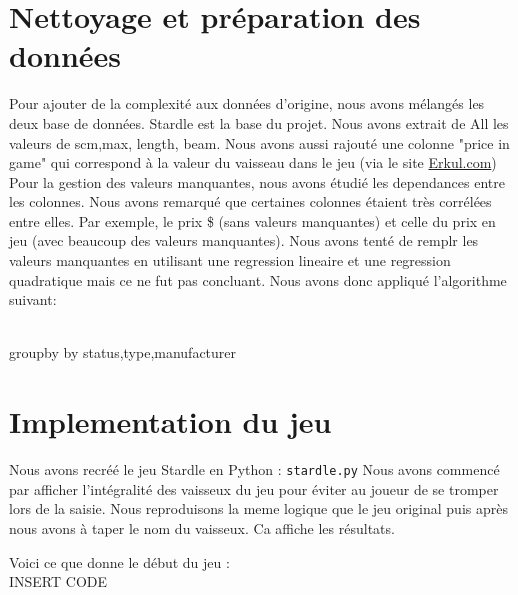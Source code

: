 \documentclass{article}
\begin{document}
\section{Nettoyage et préparation des données}

Pour ajouter de la complexité aux données d'origine, nous avons mélangés les deux base de données.
Stardle est la base du projet. Nous avons extrait de All les valeurs de scm,max, length, beam. Nous avons aussi 
rajouté une colonne "price in game" qui correspond à la valeur du vaisseau dans le jeu (via le site 
\href{https://www.erkul.games/live/calculator}{Erkul.com})\\

Pour la gestion des valeurs manquantes, nous avons étudié les dependances entre les colonnes.
Nous avons remarqué que certaines colonnes étaient très corrélées entre elles. Par exemple, le prix \$ (sans valeurs manquantes) 
et celle du prix en jeu (avec beaucoup des valeurs manquantes). Nous avons tenté de remplr les valeurs manquantes
en utilisant une regression lineaire et une regression quadratique mais ce ne fut pas concluant. 
Nous avons donc appliqué l'algorithme suivant: \\
\\

\begin{algorithm}[H]
    \SetAlgoLined
    groupby by status,type,manufacturer\;
\end{algorithm}


\section{Implementation du jeu}

Nous avons recréé le jeu Stardle en Python : \verb|stardle.py|
Nous avons commencé par afficher l'intégralité des vaisseux du jeu pour éviter au joueur de se tromper
lors de la saisie.
Nous reproduisons la meme logique que le jeu original
puis après nous avons à taper le nom du vaisseux. Ca affiche les résultats.

Voici ce que donne le début du jeu : \\

INSERT CODE 
\end{document}
